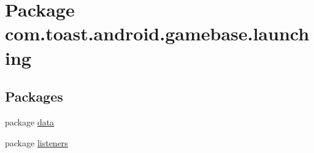 \hypertarget{namespacecom_1_1toast_1_1android_1_1gamebase_1_1launching}{}\section{Package com.\+toast.\+android.\+gamebase.\+launching}
\label{namespacecom_1_1toast_1_1android_1_1gamebase_1_1launching}
\subsection*{Packages}
\begin{DoxyCompactItemize}
\item 
package \hyperlink{namespacecom_1_1toast_1_1android_1_1gamebase_1_1launching_1_1data}{data}
\item 
package \hyperlink{namespacecom_1_1toast_1_1android_1_1gamebase_1_1launching_1_1listeners}{listeners}
\end{DoxyCompactItemize}
